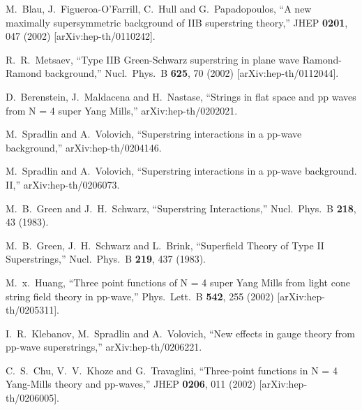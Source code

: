 \documentclass[a4paper,12pt]{article}
\begin{document}
\begin{thebibliography}{99}

M.~Blau, J.~Figueroa-O'Farrill, C.~Hull and G.~Papadopoulos, ``A
new maximally supersymmetric background of IIB superstring
theory,'' JHEP {\bf 0201}, 047 (2002) [arXiv:hep-th/0110242].

R.~R.~Metsaev, ``Type IIB Green-Schwarz superstring in plane wave
Ramond-Ramond  background,'' Nucl.\ Phys.\ B {\bf 625}, 70 (2002)
[arXiv:hep-th/0112044].

D.~Berenstein, J.~Maldacena and H.~Nastase, ``Strings in flat
space and pp waves from N = 4 super Yang Mills,''
arXiv:hep-th/0202021.

M.~Spradlin and A.~Volovich, ``Superstring interactions in a
pp-wave background,'' arXiv:hep-th/0204146.

M.~Spradlin and A.~Volovich, ``Superstring interactions in a
pp-wave background. II,'' arXiv:hep-th/0206073.

M.~B.~Green and J.~H.~Schwarz, ``Superstring Interactions,''
Nucl.\ Phys.\ B {\bf 218}, 43 (1983).

M.~B.~Green, J.~H.~Schwarz and L.~Brink, ``Superfield Theory of
Type II Superstrings,'' Nucl.\ Phys.\ B {\bf 219}, 437 (1983).

M.~x.~Huang, ``Three point functions of N = 4 super Yang Mills
from light cone string  field theory in pp-wave,'' Phys.\ Lett.\ B
{\bf 542}, 255 (2002) [arXiv:hep-th/0205311].

I.~R.~Klebanov, M.~Spradlin and A.~Volovich, ``New effects in
gauge theory from pp-wave superstrings,'' arXiv:hep-th/0206221.

C.~S.~Chu, V.~V.~Khoze and G.~Travaglini, ``Three-point functions
in N = 4 Yang-Mills theory and pp-waves,'' JHEP {\bf 0206}, 011
(2002) [arXiv:hep-th/0206005].

\end{thebibliography}
\end{document}
